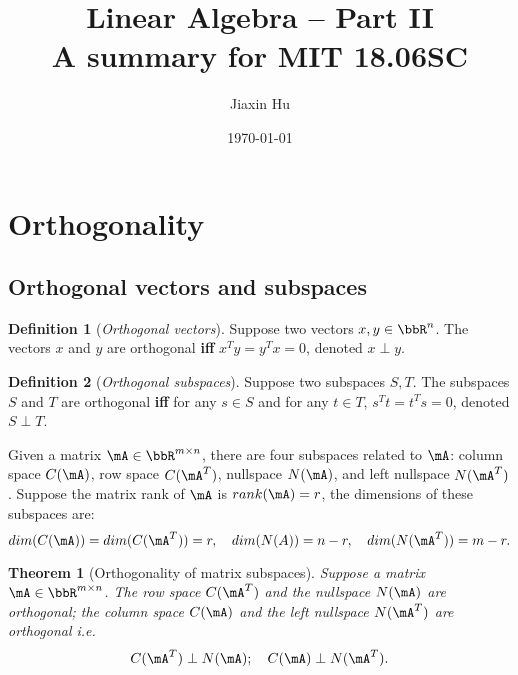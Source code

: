 \documentclass[11pt]{article}
\title{\textbf{Linear Algebra -- Part II}\\A summary for MIT 18.06SC}
\date{\today}
\author{%
Jiaxin Hu
}
\theoremstyle{plain}
\newtheorem{thm}{Theorem}[section]
\theoremstyle{definition}
\newtheorem{defn}{Definition}
\begin{document}

\maketitle


\section{Orthogonality}

\subsection{Orthogonal vectors and subspaces}
\begin{defn}[\textit{Orthogonal vectors}]\label{def:vortho}
	Suppose two vectors $x,y \in \bbR^{n}$. The vectors $x$ and $y$ are orthogonal \textbf{iff} $x^T y = y^T x = 0$, denoted $x \perp y$.
\end{defn}

\begin{defn}[\textit{Orthogonal subspaces}]\label{def:sortho}
	Suppose two subspaces $S,T$. The subspaces $S$ and $T$ are orthogonal \textbf{iff} for any $s \in S$ and for any $ t \in T$, $s^T t = t^T s = 0$, denoted $S \perp T$.
\end{defn}

Given a matrix $\mA \in \bbR^{m \times n}$, there are four subspaces related to $\mA$: column space $C(\mA)$, row space $C(\mA^T)$, nullspace $N(\mA)$, and left nullspace $N(\mA^T)$. Suppose the matrix rank of $\mA$ is $rank(\mA) = r$, the dimensions of these subspaces are: 
\[ dim(C(\mA)) = dim(C(\mA^T)) = r,\quad  dim(N(A)) = n-r,\quad dim(N(\mA^T)) = m-r. \] 

\begin{thm}[Orthogonality of matrix subspaces]\label{thm:ortho}
	Suppose a matrix $\mA \in \bbR^{m \times n}$. The row space $C(\mA^T)$ and the nullspace $N(\mA)$ are orthogonal; the column space $C(\mA)$ and the left nullspace $N(\mA^T)$ are orthogonal i.e.\
	\[ C(\mA^T) \perp N(\mA); \quad C(\mA) \perp N(\mA^T).  \]
\end{thm}
\end{document}
